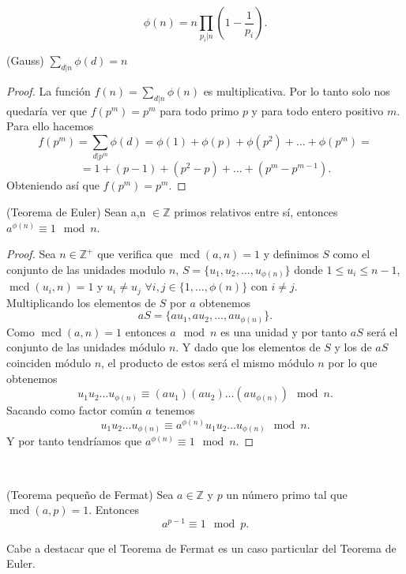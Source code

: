 \begin{corolario}
	 $$\phi(n)=n\prod_{p_i|n}\left(1-\frac{1}{p_i}\right).$$ 
\end{corolario}

\begin{lema}
		(Gauss) $\sum_{d|n}\phi(d)=n$
\end{lema}
\begin{proof}
		La función $f(n)=\sum_{d|n}\phi(n)$   es multiplicativa. Por lo tanto solo nos quedaría ver que $f(p^m)=p^m$ para todo primo $p$ y para todo entero positivo $m$.\\ Para ello hacemos
		$$
			f(p^m)=\sum_{d|p^m}\phi(d)=\phi(1)+\phi(p)+\phi(p^2)+\dots+\phi(p^m)= 
		$$\vspace*{-7mm}
		$$
			= 1+(p-1)+(p^2-p)+\dots+(p^m-p^{m-1}).
		$$
		Obteniendo así que $f(p^m)=p^m$.
\end{proof}
\begin{teorema}
	(Teorema de Euler) Sean a,n $\in \mathbb{Z}$ primos relativos entre sí, entonces $a^{\phi(n)}\equiv 1 \mod n$.
\end{teorema}
\begin{proof}
		Sea $n\in \mathbb{Z^+}$ que verifica que $\operatorname{mcd}(a,n)=1$ y definimos $S$ como el conjunto de las unidades modulo $n$, $S=\{u_1,u_2,\dots,u_{\phi(n)}\}$ donde $1\leq u_i\leq n-1$, $\operatorname{mcd}(u_i,n)=1$ y $u_i\neq u_j$ $\forall i,j \in \{1,\dots,\phi(n)\}$ con $ i\neq j$.\\
	Multiplicando  los elementos de $S$ por $a$ obtenemos 
	$$
		aS=\{au_1,au_2,\dots,au_{\phi(n)}\}.
	$$
	Como $\operatorname{mcd}(a,n)=1$ entonces $a\mod n$ es una unidad y por tanto $aS$ será el conjunto de las unidades módulo $n$. Y dado que los elementos de $S$ y los de $aS$ coinciden módulo $n$, el producto de estos será el mismo módulo $n$ por lo que obtenemos 
	$$
		u_1u_2\dots u_{\phi(n)} \equiv (au_1)(au_2)\dots (au_{\phi(n)})\mod n.
	$$
	Sacando como factor común $a$ tenemos 
	$$
		u_1u_2\dots u_{\phi(n)} \equiv a^{\phi(n)}u_1u_2\dots u_{\phi(n)}\mod n. 
	$$
	Y por tanto tendríamos que $a^{\phi(n)}\equiv 1 \mod n$.
\end{proof}\\

\begin{teorema}
		(Teorema pequeño de Fermat) Sea $a \in \mathbb{Z}$ y $p$ un número primo tal que $\operatorname{mcd}(a,p)=1$. Entonces
	$$
		a^{p-1} \equiv 1 \mod p.
	$$
\end{teorema}

Cabe a destacar que el Teorema de Fermat es un caso particular del Teorema de Euler.\\

